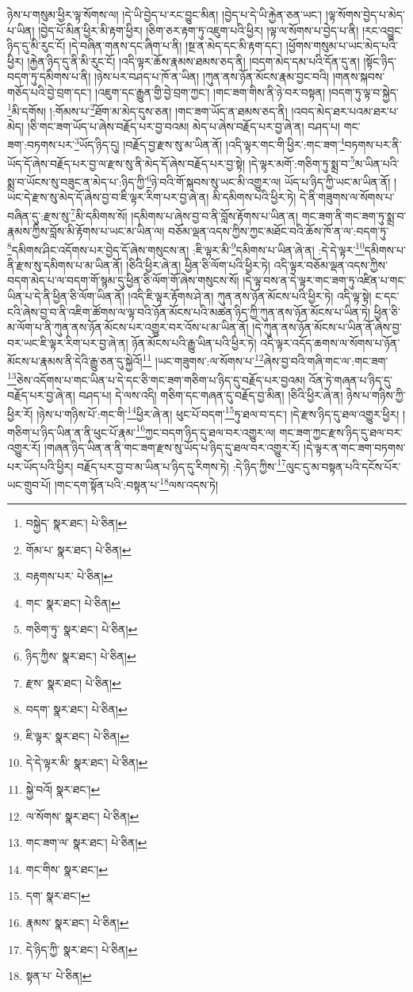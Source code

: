 ཉེས་པ་གསུམ་ཕྱིར་ལྟ་སོགས་ལ། །དེ་ཡི་བྱེད་པ་རང་བྱུང་མིན། །བྱེད་པ་དེ་ཡི་རྐྱེན་ཅན་ཡང་། །ལྟ་སོགས་བྱེད་པ་མེད་པ་ཡིན། །བྱེད་པོ་མིན་ཕྱིར་མི་རྟག་ཕྱིར། །ཅིག་ཅར་རྟག་ཏུ་འཇུག་པའི་ཕྱིར། །ལྟ་ལ་སོགས་པ་བྱེད་པ་ནི། །རང་འབྱུང་ཉིད་དུ་མི་རུང་ངོ། །དེ་བཞིན་གནས་དང་ཞིག་པ་ནི། །སྔ་ན་མེད་དང་མི་རྟག་དང་། །ཕྱོགས་གསུམ་པ་ཡང་མེད་པའི་ཕྱིར། །རྐྱེན་ཉིད་དུ་ནི་མི་རུང་ངོ། །འདི་ལྟར་ཆོས་རྣམས་ཐམས་ཅད་ནི། །བདག་མེད་དམ་པའི་དོན་དུ་ན། །སྟོང་ཉིད་བདག་ཏུ་དམིགས་པ་ནི། །ཉེས་པར་བཤད་པ་ཁོ་ན་ཡིན། །ཀུན་ནས་ཉོན་མོངས་རྣམ་བྱང་བའི། །གནས་སྐབས་གཅོད་པའི་བྱེ་བྲག་དང་། །འཇུག་དང་རྒྱུན་གྱི་བྱེ་བྲག་ཀྱང་། །གང་ཟག་གིས་ནི་ཉེ་བར་བསྟན། །བདག་ཏུ་ལྟ་བ་སྐྱེད་\footnote{བསྐྱེད་  སྣར་ཐང་།  པེ་ཅིན། }མི་དགོས། །:གོམས་པ་\footnote{གོམ་པ་  སྣར་ཐང་།  པེ་ཅིན། }ཐོག་མ་མེད་དུས་ཅན། །གང་ཟག་ཡོད་ན་ཐམས་ཅད་ནི། །འབད་མེད་ཐར་པའམ་ཐར་པ་མེད། །ཅི་གང་ཟག་ཡོད་པ་ཞེས་བརྗོད་པར་བྱ་བའམ། མེད་པ་ཞེས་བརྗོད་པར་བྱ་ཞེ་ན། བཤད་པ། གང་ཟག་:བཏགས་པར་\footnote{བརྟགས་པར་  པེ་ཅིན། }ཡོད་ཉིད་དུ། །བརྗོད་བྱ་རྫས་སུ་མ་ཡིན་ནོ། །འདི་ལྟར་གང་གི་ཕྱིར་:གང་ཟག་\footnote{གང་  སྣར་ཐང་།  པེ་ཅིན། }བཏགས་པར་ནི་ཡོད་དོ་ཞེས་བརྗོད་པར་བྱ་ལ་རྫས་སུ་ནི་མེད་དོ་ཞེས་བརྗོད་པར་བྱ་སྟེ། །དེ་ལྟར་མགོ་:གཅིག་ཏུ་སྨྲ་བ་\footnote{གཅིག་ཏུ་  སྣར་ཐང་།  པེ་ཅིན། }མ་ཡིན་པའི་སྨྲ་བ་ཡོངས་སུ་བཟུང་ན་མེད་པ་:ཉིད་ཀྱི་\footnote{ཉིད་ཀྱིས་  སྣར་ཐང་།  པེ་ཅིན། }ཉེ་བའི་གོ་སྐབས་སུ་ཡང་མི་འགྱུར་ལ། ཡོད་པ་ཉིད་ཀྱི་ཡང་མ་ཡིན་ནོ། །ཡང་དེ་རྫས་སུ་མེད་དོ་ཞེས་བྱ་བ་ཇི་ལྟར་རིག་པར་བྱ་ཞེ་ན། མི་དམིགས་པའི་ཕྱིར་ཏེ། དེ་ནི་གཟུགས་ལ་སོགས་པ་བཞིན་དུ་:རྫས་སུ་\footnote{རྫས་  སྣར་ཐང་།  པེ་ཅིན། }མི་དམིགས་སོ། །དམིགས་པ་ཞེས་བྱ་བ་ནི་བློས་རྟོགས་པ་ཡིན་ན། གང་ཟག་ནི་གང་ཟག་ཏུ་སྨྲ་བ་རྣམས་ཀྱིས་བློས་མི་རྟོགས་པ་ཡང་མ་ཡིན་ལ། བཅོམ་ལྡན་འདས་ཀྱིས་ཀྱང་མཐོང་བའི་ཆོས་ཁོ་ན་ལ་:བདག་ཏུ་\footnote{བདག་  སྣར་ཐང་།  པེ་ཅིན། }དམིགས་ཤིང་འདོགས་པར་བྱེད་དོ་ཞེས་གསུངས་ན། :ཇི་ལྟར་མི་\footnote{ཇི་ལྟར་  སྣར་ཐང་།  པེ་ཅིན། }དམིགས་པ་ཡིན་ཞེ་ན། :དེ་དེ་ལྟར་\footnote{དེ་དེ་ལྟར་མི་  སྣར་ཐང་།  པེ་ཅིན། }དམིགས་པ་ནི་རྫས་སུ་དམིགས་པ་མ་ཡིན་ནོ། །ཅིའི་ཕྱིར་ཞེ་ན། ཕྱིན་ཅི་ལོག་པའི་ཕྱིར་ཏེ། འདི་ལྟར་བཅོམ་ལྡན་འདས་ཀྱིས་བདག་མེད་པ་ལ་བདག་གོ་སྙམ་དུ་ཕྱིན་ཅི་ལོག་གོ་ཞེས་གསུངས་སོ། །དེ་ལྟ་བས་ན་དེ་ལྟར་གང་ཟག་ཏུ་འཛིན་པ་གང་ཡིན་པ་དེ་ནི་ཕྱིན་ཅི་ལོག་ཡིན་ནོ། །འདི་ཇི་ལྟར་རྟོགས་ཤེ་ན། ཀུན་ནས་ཉོན་མོངས་པའི་ཕྱིར་ཏེ། འདི་ལྟ་སྟེ། ང་དང་ངའི་ཞེས་བྱ་བ་ནི་འཇིག་ཚོགས་ལ་ལྟ་བའི་ཉོན་མོངས་པའི་མཚན་ཉིད་ཀྱི་ཀུན་ནས་ཉོན་མོངས་པ་ཡིན་ཏེ། ཕྱིན་ཅི་མ་ལོག་པ་ནི་ཀུན་ནས་ཉོན་མོངས་པར་འགྱུར་བར་འོས་པ་མ་ཡིན་ནོ། །དེ་ཀུན་ནས་ཉོན་མོངས་པ་ཡིན་ནོ་ཞེས་བྱ་བར་ཡང་ཇི་ལྟར་རིག་པར་བྱ་ཞེ་ན། ཉོན་མོངས་པའི་རྒྱུ་ཡིན་པའི་ཕྱིར་ཏེ། འདི་ལྟར་འདོད་ཆགས་ལ་སོགས་པ་ཉོན་མོངས་པ་རྣམས་ནི་དེའི་རྒྱུ་ཅན་དུ་སྐྱེའོ།\footnote{སྐྱེ་བའོ།  སྣར་ཐང་། } །ཡང་གཟུགས་:ལ་སོགས་པ་\footnote{ལ་སོགས་  སྣར་ཐང་།  པེ་ཅིན། }ཞེས་བྱ་བའི་གཞི་གང་ལ་:གང་ཟག་\footnote{གང་ཟག་ལ་  སྣར་ཐང་།  པེ་ཅིན། }ཅེས་འདོགས་པ་གང་ཡིན་པ་དེ་དང་ཅི་གང་ཟག་གཅིག་པ་ཉིད་དུ་བརྗོད་པར་བྱའམ། འོན་ཏེ་གཞན་པ་ཉིད་དུ་བརྗོད་པར་བྱ་ཞེ་ན། བཤད་པ། དེ་ལས་འདི། གཅིག་དང་གཞན་དུ་བརྗོད་བྱ་མིན། །ཅིའི་ཕྱིར་ཞེ་ན། ཉེས་པ་གཉིས་ཀྱི་ཕྱིར་རོ། །ཉེས་པ་གཉིས་པོ་:གང་གི་\footnote{གང་གིས་  སྣར་ཐང་། }ཕྱིར་ཞེ་ན། ཕུང་པོ་བདག་\footnote{དག་  སྣར་ཐང་། }ཏུ་ཐལ་བ་དང་། །དེ་རྫས་ཉིད་དུ་ཐལ་འགྱུར་ཕྱིར། །གཅིག་པ་ཉིད་ཡིན་ན་ནི་ཕུང་པོ་རྣམ་\footnote{རྣམས་  སྣར་ཐང་།  པེ་ཅིན། }ཀྱང་བདག་ཉིད་དུ་ཐལ་བར་འགྱུར་ལ། གང་ཟག་ཀྱང་རྫས་ཉིད་དུ་ཐལ་བར་འགྱུར་རོ། །གཞན་ཉིད་ཡིན་ན་ནི་གང་ཟག་རྫས་སུ་ཡོད་པ་ཉིད་དུ་ཐལ་བར་འགྱུར་རོ། །དེ་ལྟར་ན་གང་ཟག་བཏགས་པར་ཡོད་པའི་ཕྱིར། བརྗོད་པར་བྱ་བ་མ་ཡིན་པ་ཉིད་དུ་རིགས་ཏེ། :དེ་ཉིད་ཀྱིས་\footnote{དེ་ཉིད་ཀྱི་  སྣར་ཐང་།  པེ་ཅིན། }ལུང་དུ་མ་བསྟན་པའི་དངོས་པོར་ཡང་གྲུབ་པོ། །གང་དག་སྟོན་པའི་:བསྟན་པ་\footnote{སྟན་པ་  པེ་ཅིན། }ལས་འདས་ཏེ། 